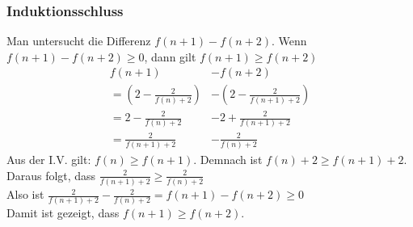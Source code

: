 \documentclass{article}
\begin{document}
\subsubsection{Induktionsschluss}
Man untersucht die Differenz $f(n + 1) - f(n + 2)$. Wenn $f(n + 1) - f(n + 2) \geq 0$, dann gilt $f(n + 1) \geq f(n + 2)$
\begin{align*}
    f(n + 1) &- f(n + 2) \\
    = \left(2 - \frac{2}{f(n) + 2}\right) &- \left(2 - \frac{2}{f(n + 1) + 2}\right) \\
    = 2 - \frac{2}{f(n)+2} &- 2 + \frac{2}{f(n+1) + 2} \\
    = \frac{2}{f(n+1) + 2} &- \frac{2}{f(n) + 2}
\end{align*}
Aus der I.V. gilt: $f(n) \geq f(n + 1)$. Demnach ist $f(n) + 2 \geq f(n + 1) + 2$. \\
Daraus folgt, dass $\frac{2}{f(n+1) + 2} \geq \frac{2}{f(n) + 2}$ \\
Also ist $\frac{2}{f(n+1)+2} - \frac{2}{f(n)+2} = f(n + 1) - f(n + 2) \geq 0$ \\
Damit ist gezeigt, dass $f(n + 1) \geq f(n + 2)$.
\end{document}

